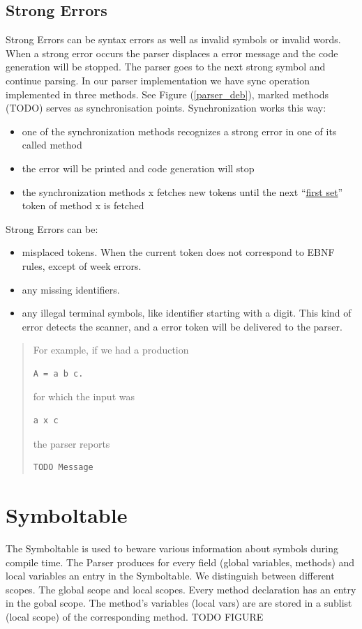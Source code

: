 \subsection{Strong Errors}
\label{label_strong_errors}
Strong Errors can be syntax errors as well as invalid symbols or invalid words. When a strong error occurs the parser displaces a error
message and the code generation will be stopped. The parser goes to the next strong symbol and continue parsing. In our parser
implementation we have sync operation implemented in three methods. See Figure (\ref{parser_deb}), marked methods (TODO) serves as
synchronisation points. Synchronization works this way:
\begin{itemize}
  \item one of the synchronization methods recognizes a strong error in one of its called method
  \item the error will be printed and code generation will stop
  \item the synchronization methods x fetches new tokens until the next ``\hyperref[first_sets]{first set}'' token of method x is fetched
\end{itemize}
Strong Errors can be:
\begin{itemize}
  \item misplaced tokens. When the current token does not correspond to EBNF rules, except of week errors.
  \item any missing identifiers.
  \item any illegal terminal symbols, like identifier starting with a digit. This kind of error detects the scanner, and a
  error token will be delivered to the parser.
\end{itemize}
\begin{quote}
For example, if we had a production
\begin{verbatim}
A = a b c.
\end{verbatim}
for which the input was
\begin{verbatim}
a x c
\end{verbatim}
the parser reports
\begin{verbatim}
TODO Message
\end{verbatim}
\end{quote}


\section{Symboltable}
\label{labelSymboltable}

The Symboltable is used to beware various information about symbols during compile time.
The Parser produces for every field (global variables, methods) and local variables an entry in the Symboltable.
We distinguish between different scopes. The global scope and local scopes. Every
method declaration has an entry in the gobal scope. The method's variables (local vars) are are stored in a sublist (local scope) of the corresponding method. TODO FIGURE


